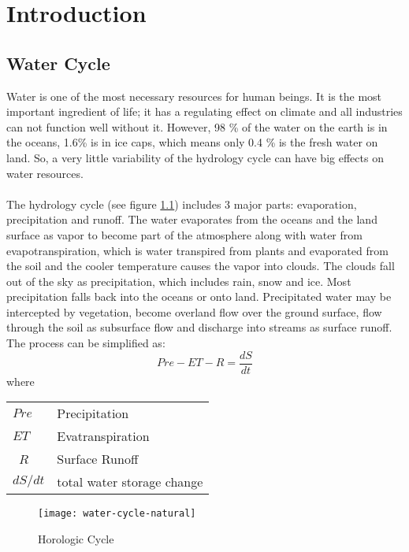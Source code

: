 \chapter{Introduction}
\section{Water Cycle}
Water is one of the most necessary resources for human beings. It is the most important ingredient of life; it has a regulating effect on climate and all industries can not function well without it. However, 98 \%
of the water on the earth is in the oceans, 1.6\% is in ice caps, which means only 0.4 \% is the
fresh water on land. So, a very little variability of the hydrology cycle can have big effects on
water resources. \\\\
The hydrology cycle (see figure \ref{fig:hydrologic cycle}) includes 3 major parts: evaporation, precipitation and runoff. The water evaporates from the oceans and the land surface as vapor to become part of the atmosphere along with water from evapotranspiration, which is water transpired from plants and evaporated from the soil and the cooler temperature causes the vapor into clouds. The clouds fall out of the sky as precipitation, which includes rain, snow and ice. Most precipitation falls back into the oceans or onto land. Precipitated water may be intercepted by vegetation, become overland flow over the ground surface, flow through the soil as subsurface flow and discharge into streams as surface runoff. The process can be simplified as:
\begin{equation}
	 Pre - ET - R = \frac{dS}{dt}
\end{equation}
where
\begin{table}[htbp]
	\begin{tabular}{ll}
		$Pre$   & Precipitation    \\ 
		$ET$    & Evatranspiration \\ \
		$R$     & Surface Runoff \\ 
		$dS / dt$ & total water storage change \\ 
	\end{tabular}
\end{table}
\begin{figure}[htbp]
	\centering
	\texttt{[image: water-cycle-natural]} %
	\caption{Horologic Cycle} 
	\label{fig:hydrologic cycle}
\end{figure}
